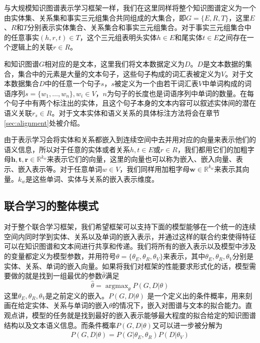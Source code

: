 与大规模知识图谱表示学习框架一样，我们在这里同样将整个知识图谱定义为一个由实体集、关系集和事实三元组集合共同组成的大集合，即$G = \{E, R, T\}$，这里$E$、$R$和$T$分别表示实体集合、关系集合和事实三元组集合。对于事实三元组集合中的任意事实$(h, r, t) \in T$，这个三元组表明头实体$h \in E$和尾实体$t \in E$之间存在一个逻辑上的关联$r \in R$。

和知识图谱$G$相对应的是文本，这里我们将文本数据定义为$D$。$D$是文本数据的集合，集合中的元素是大量的文本句子，这些句子构成的词汇表被定义为$V$。对于文本数据集合$D$中的任意一个句子$s$，$s$被定义为一个由若干词汇表$V$中单词构成的词语序列$s = \{w_1, \ldots, w_n\}, w_i \in V$，$n$为句子的长度也是词语序列中单词的数量。在每个句子中有两个标注出的实体，且这个句子本身的文本内容可以叙述实体间的潜在语义关联$r_s \in R$。对于文本实体和语义关系的具体标注方法将会在章节\ref{sec:alignment}处被介绍。

由于表示学习会将实体和关系都嵌入到连续空间中去并用对应的向量来表示他们的语义信息，所以对于任意的实体或者关系$h, t \in E$或$r \in R$，我们都用它们的加粗字母$\mathbf{h}, \mathbf{t}, \mathbf{r} \in \mathbb{R}^{k_w}$来表示它们的向量，这里的向量也可以称为嵌入、嵌入向量、表示、嵌入表示等。对于任意单词$w \in V$，我们同样用加粗字母$\mathbf{w}\in \mathbb{R}^{k_w}$来表示其向量。$k_w$是这些单词、实体与关系的嵌入表示维度。

\subsection{联合学习的整体模式}
\label{sec:joint}

对于整个联合学习框架，我们希望框架可以支持下面的模型能够在一个统一的连续空间内同时学到实体、关系以及单词的嵌入表示，并通过这样的联合约束使得特征可以在知识图谱和文本间进行共享和传递。我们将所有的嵌入表示以及模型中涉及的变量都定义为模型参数，并用符号$\theta = \{\theta_E, \theta_R, \theta_V\}$来表示，其中$\theta_E, \theta_R, \theta_V$分别是实体、关系、单词的嵌入向量。如果将我们对框架的性能要求形式化的话，模型需要做的就是找到一组最优的参数$\hat{\theta}$满足
\begin{equation}
\hat{\theta} = \mathop{\arg\max}_{\theta} P(G, D | {\theta})
\end{equation}
这里$\theta_E, \theta_R, \theta_V$是之前定义的嵌入。$P(G, D | {\theta})$ 是一个定义出的条件概率，用来刻画在给定实体、关系与单词的嵌入$\theta$的情况下，嵌入对图谱与文本的拟合能力。直观点讲，模型的任务就是找到最好的嵌入表示能够最大程度的拟合给定的知识图谱结构以及文本语义信息。而条件概率$P(G, D | {\theta})$又可以进一步被分解为
\begin{align}
\label{eq:topeq}
P(G,D|{\theta}) = P(G|{\theta_E,\theta_R})P(D|{\theta_V})
\end{align}

